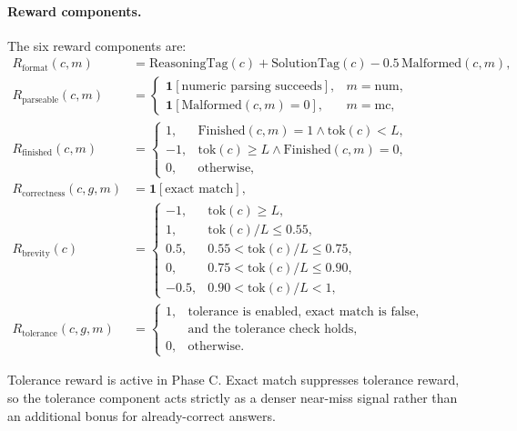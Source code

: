 \documentclass{article} %
\begin{document}
\paragraph{Reward components.}
The six reward components are:
\begin{align}
R_{\mathrm{format}}(c,m) &= \mathrm{ReasoningTag}(c) + \mathrm{SolutionTag}(c)
- 0.5\,\mathrm{Malformed}(c,m),\\
R_{\mathrm{parseable}}(c,m) &=
\begin{cases}
\mathbf{1}[\text{numeric parsing succeeds}], & m=\mathrm{num},\\
\mathbf{1}[\mathrm{Malformed}(c,m)=0], & m=\mathrm{mc},
\end{cases}\\
R_{\mathrm{finished}}(c,m) &=
\begin{cases}
1, & \mathrm{Finished}(c,m)=1 \wedge \mathrm{tok}(c)<L,\\
-1, & \mathrm{tok}(c)\ge L \wedge \mathrm{Finished}(c,m)=0,\\
0, & \text{otherwise},
\end{cases}\\
R_{\mathrm{correctness}}(c,g,m) &= \mathbf{1}[\text{exact match}],\\
R_{\mathrm{brevity}}(c) &=
\begin{cases}
-1, & \mathrm{tok}(c)\ge L,\\
1, & \mathrm{tok}(c)/L \le 0.55,\\
0.5, & 0.55 < \mathrm{tok}(c)/L \le 0.75,\\
0, & 0.75 < \mathrm{tok}(c)/L \le 0.90,\\
-0.5, & 0.90 < \mathrm{tok}(c)/L < 1,
\end{cases}\\
R_{\mathrm{tolerance}}(c,g,m) &=
\begin{cases}
1, & \text{tolerance is enabled, exact match is false,}\\
   & \text{and the tolerance check holds},\\
0, & \text{otherwise}.
\end{cases}
\end{align}

Tolerance reward is active in Phase C. Exact match suppresses tolerance reward, so the tolerance component acts strictly as a denser near-miss signal rather than an additional bonus for already-correct answers.
\end{document}
